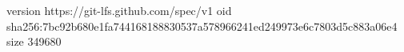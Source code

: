 version https://git-lfs.github.com/spec/v1
oid sha256:7bc92b680e1fa744168188830537a578966241ed249973e6c7803d5c883a06e4
size 349680
